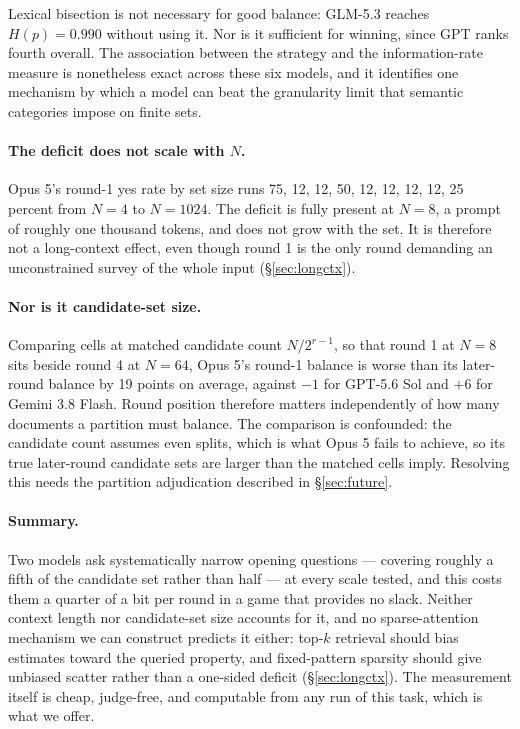 \documentclass[11pt]{article}
\begin{document}
Lexical bisection is not necessary for good balance: GLM-5.3 reaches
$H(p)=0.990$ without using it. Nor is it sufficient for winning, since GPT ranks
fourth overall. The association between the strategy and the information-rate
measure is nonetheless exact across these six models, and it identifies one
mechanism by which a model can beat the granularity limit that semantic
categories impose on finite sets.



\paragraph{The deficit does not scale with $N$.} Opus 5's round-1 yes rate by
set size runs 75, 12, 12, 50, 12, 12, 12, 12, 25 percent from $N{=}4$ to
$N{=}1024$. The deficit is fully present at $N{=}8$, a prompt of roughly one
thousand tokens, and does not grow with the set. It is therefore not a
long-context effect, even though round 1 is the only round demanding an
unconstrained survey of the whole input (\S\ref{sec:longctx}).

\paragraph{Nor is it candidate-set size.} Comparing cells at matched candidate
count $N/2^{r-1}$, so that round 1 at $N{=}8$ sits beside round 4 at $N{=}64$,
Opus 5's round-1 balance is worse than its later-round balance by 19 points on
average, against $-1$ for GPT-5.6 Sol and $+6$ for Gemini 3.8 Flash. Round
position therefore matters independently of how many documents a partition must
balance. The comparison is confounded: the candidate count assumes even splits,
which is what Opus 5 fails to achieve, so its true later-round candidate sets
are larger than the matched cells imply. Resolving this needs the partition
adjudication described in \S\ref{sec:future}.

\paragraph{Summary.} Two models ask systematically narrow opening
questions --- covering roughly a fifth of the candidate set rather than half ---
at every scale tested, and this costs them a quarter of a bit per round in a
game that provides no slack. Neither context length nor candidate-set size
accounts for it, and no
sparse-attention mechanism we can construct predicts it either: top-$k$
retrieval should bias estimates toward the queried property, and fixed-pattern
sparsity should give unbiased scatter rather than a one-sided deficit
(\S\ref{sec:longctx}). The measurement itself is cheap, judge-free, and computable from
any run of this task, which is what we offer.
\end{document}
